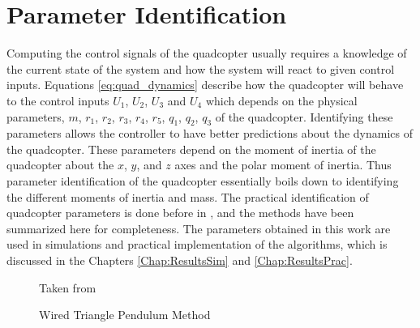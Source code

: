 \documentclass[letterpaper%
, twoside%
, 12pt%
,memoire%
, english%
,creativecommons,hyperref%
]{thETS}
\begin{document}
\section{Parameter Identification} \label{parameter_identification}
Computing the control signals of the quadcopter usually requires a knowledge of the current state of the system and how the system will react to given control inputs. Equations \eqref{eq:quad_dynamics} describe how the quadcopter will behave to the control inputs $U_1$, $U_2$, $U_3$ and $U_4$ which depends on the physical parameters, $m$, $r_1$, $r_2$, $r_3$, $r_4$, $r_5$, $q_1$, $q_2$, $q_3$ of the quadcopter. Identifying these parameters allows the controller to have better predictions about the dynamics of the quadcopter. These parameters depend on the moment of inertia of the quadcopter about the $x$, $y$, and $z$ axes and the polar moment of inertia. 
Thus parameter identification of the quadcopter essentially boils down to identifying the different moments of inertia and mass. The practical identification of quadcopter parameters is done before in \citep{RN121}, and the methods have been summarized here for completeness. The parameters obtained in this work are used in simulations and practical implementation of the algorithms, which is discussed in the Chapters \ref{Chap:ResultsSim} and \ref{Chap:ResultsPrac}.\\
\begin{figure}
	\centering 
	 \parbox{0.75\textwidth}{
		\begin{center}
		\caption{Wired Triangle Pendulum Method\label{swm_c2}}Taken from \citep{RN121}
		\end{center}	
	} 
\end{figure}
\end{document}
